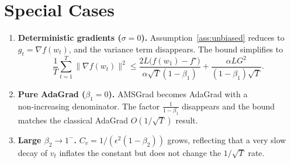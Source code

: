 \documentclass{article}
\begin{document}
\section*{Special Cases}
\begin{enumerate}
\item \textbf{Deterministic gradients ($\sigma=0$).}  
Assumption~\ref{ass:unbiased} reduces to $g_{t}=\nabla f(w_{t})$, and the variance term disappears. The bound simplifies to
\[
\frac{1}{T}\sum_{t=1}^{T}\|\nabla f(w_{t})\|^{2}
\le \frac{2L\bigl(f(w_{1})-f^{\star}\bigr)}{\alpha\sqrt{T}(1-\beta_{1})}
+\frac{\alpha L G^{2}}{(1-\beta_{1})\sqrt{T}}.
\]

\item \textbf{Pure AdaGrad ($\beta_{1}=0$).}  
AMSGrad becomes AdaGrad with a non‑increasing denominator. The factor $\frac{1}{1-\beta_{1}}$ disappears and the bound matches the classical AdaGrad $O(1/\sqrt{T})$ result.

\item \textbf{Large $\beta_{2}\to1^{-}$.}  
$C_{v}=1/(\epsilon^{2}(1-\beta_{2}))$ grows, reflecting that a very slow decay of $v_{t}$ inflates the constant but does not change the $1/\sqrt{T}$ rate.

\end{enumerate}
\end{document}

